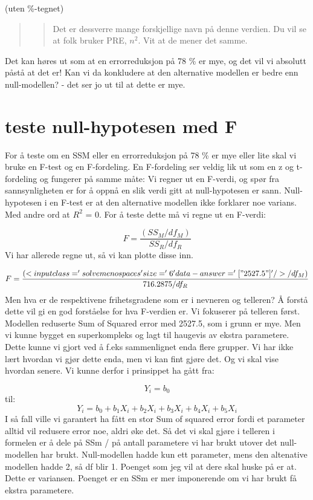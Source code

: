 \documentclass[
]{book}
\begin{document}
(uten \%-tegnet)

\begin{quote}
\begin{quote}
Det er dessverre mange forskjellige navn på denne verdien. Du vil se at folk bruker PRE, \(n^2\). Vit at de mener det samme.
\end{quote}
\end{quote}

Det kan høres ut som at en errorreduksjon på 78 \% er mye, og det vil vi absolutt påstå at det er! Kan vi da konkludere at den alternative modellen er bedre enn null-modellen? - det ser jo ut til at dette er mye.

\hypertarget{teste-null-hypotesen-med-f}{%
\section{teste null-hypotesen med F}\label{teste-null-hypotesen-med-f}}

For å teste om en SSM eller en errorreduksjon på 78 \% er mye eller lite skal vi bruke en F-test og en F-fordeling. En F-fordeling ser veldig lik ut som en z og t-fordeling og fungerer på samme måte: Vi regner ut en F-verdi, og spør fra sannsynligheten er for å oppnå en slik verdi gitt at null-hypotesen er sann. Null-hypotesen i en F-test er at den alternative modellen ikke forklarer noe varians. Med andre ord at \(R^2\) = 0. For å teste dette må vi regne ut en F-verdi:

\[
F = \frac{(SS_M / df_M)}{SS_R / df_R}
\]
Vi har allerede regne ut, så vi kan plotte disse inn.

\[
F = \frac{(<input class='solveme nospaces' size='6' data-answer='["2527.5"]'/> / df_M)}{716.2875 / df_R}
\]
Men hva er de respektivene frihetsgradene som er i nevneren og telleren? Å forstå dette vil gi en god forståelse for hva F-verdien er. Vi fokuserer på telleren først. Modellen reduserte Sum of Squared error med 2527.5, som i grunn er mye. Men vi kunne bygget en superkompleks og lagt til haugevis av ekstra parametere. Dette kunne vi gjort ved å f.eks sammenlignet enda flere grupper. Vi har ikke lært hvordan vi gjør dette enda, men vi kan fint gjøre det. Og vi skal vise hvordan senere. Vi kunne derfor i prinsippet ha gått fra:

\[
Y_i = b_0
\]
til:
\[
Y_i  = b_0 + b_1X_i + b_2X_i + b_3X_i + b_4X_i + b_5X_i
\]
I så fall ville vi garantert ha fått en stor Sum of squared error fordi et parameter alltid vil redusere error noe, aldri øke det. Så det vi skal gjøre i telleren i formelen er å dele på SSm / på antall parametere vi har brukt utover det null-modellen har brukt. Null-modellen hadde kun ett parameter, mens den altenative modellen hadde 2, så df blir 1. Poenget som jeg vil at dere skal huske på er at. Dette er variansen. Poenget er en SSm er mer imponerende om vi har brukt få ekstra parametere.
\end{document}
